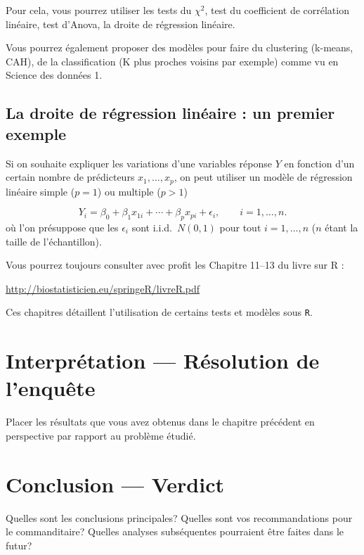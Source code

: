 \documentclass[mstat,12pt]{unswthesis}
\begin{document}
Pour cela, vous pourrez utiliser les tests du \(\chi^2\), test du
coefficient de corrélation linéaire, test d'Anova, la droite de
régression linéaire.

Vous pourrez également proposer des modèles pour faire du clustering
(k-means, CAH), de la classification (K plus proches voisins par
exemple) comme vu en Science des données 1.

\section{La droite de régression linéaire : un premier
exemple}\label{la-droite-de-ruxe9gression-linuxe9aire-un-premier-exemple}

Si on souhaite expliquer les variations d'une variables réponse \(Y\) en
fonction d'un certain nombre de prédicteurs \(x_1,\ldots,x_p\), on peut
utiliser un modèle de régression linéaire simple (\(p=1\)) ou multiple
(\(p>1\))

\[
Y_i = \beta_0 + \beta_1 x_{1i} + \cdots +\beta_p x_{pi} + \epsilon_i, \qquad i=1,\ldots,n.
\] où l'on présuppose que les \(\epsilon_i\) sont i.i.d.~\(N(0,1)\) pour
tout \(i=1,\ldots,n\) (\(n\) étant la taille de l'échantillon).

Vous pourrez toujours consulter avec profit les Chapitre 11--13 du livre
sur R :

\url{http://biostatisticien.eu/springeR/livreR.pdf}

Ces chapitres détaillent l'utilisation de certains tests et modèles sous
\texttt{R}.

\chapter{Interprétation --- Résolution de
l'enquête}\label{interpruxe9tation-ruxe9solution-de-lenquuxeate}

Placer les résultats que vous avez obtenus dans le chapitre précédent en
perspective par rapport au problème étudié.

\chapter{Conclusion --- Verdict}\label{conclusion-verdict}

Quelles sont les conclusions principales? Quelles sont vos
recommandations pour le commanditaire? Quelles analyses subséquentes
pourraient être faites dans le futur?

\bigskip
\end{document}
